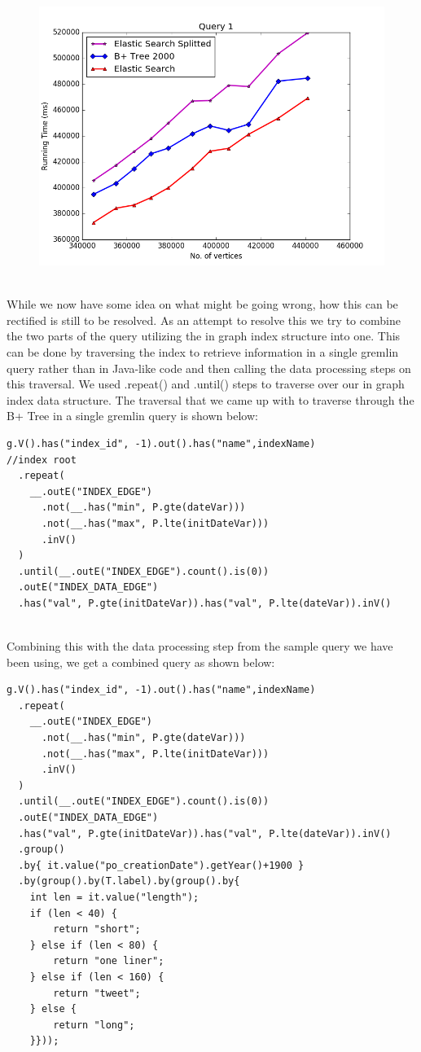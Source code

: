 \begin{figure}[H]
\centering
\includegraphics[width=.8\linewidth]{Figures/figure_1-100}
\label{fig:test1}
\end{figure}
$\:$\\
While we now have some idea on what might be going wrong, how this can be rectified is still to be resolved. As an attempt to resolve this we try to combine the two parts of the query utilizing the in graph index structure into one. This can be done by traversing the index to retrieve information in a single gremlin query rather than in Java-like code and then calling the data processing steps on this traversal.  We used .repeat() and .until() steps to traverse over our in graph index data structure. The traversal that we came up with to traverse through the B+ Tree in a single gremlin query is shown below:
\\
\begin{lstlisting}
g.V().has("index_id", -1).out().has("name",indexName)           //index root
  .repeat(
    __.outE("INDEX_EDGE")
      .not(__.has("min", P.gte(dateVar)))
      .not(__.has("max", P.lte(initDateVar)))
      .inV()
  )
  .until(__.outE("INDEX_EDGE").count().is(0))
  .outE("INDEX_DATA_EDGE")
  .has("val", P.gte(initDateVar)).has("val", P.lte(dateVar)).inV()
\end{lstlisting}
$\:$\\
Combining this with the data processing step from the sample query we have been using, we get a combined query as shown below:
\\
\begin{lstlisting}
g.V().has("index_id", -1).out().has("name",indexName)
  .repeat(
    __.outE("INDEX_EDGE")
      .not(__.has("min", P.gte(dateVar)))
      .not(__.has("max", P.lte(initDateVar)))
      .inV()
  )
  .until(__.outE("INDEX_EDGE").count().is(0))
  .outE("INDEX_DATA_EDGE")
  .has("val", P.gte(initDateVar)).has("val", P.lte(dateVar)).inV()
  .group()
  .by{ it.value("po_creationDate").getYear()+1900 }
  .by(group().by(T.label).by(group().by{
    int len = it.value("length");
    if (len < 40) {
        return "short";
    } else if (len < 80) {
        return "one liner";
    } else if (len < 160) {
        return "tweet";
    } else {
        return "long";
    }}));
\end{lstlisting}

